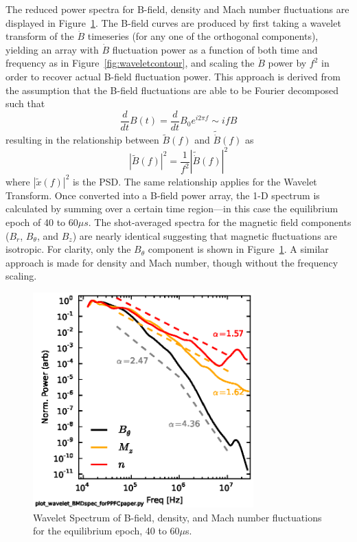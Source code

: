 \documentclass[12pt]{iopart}
\begin{document}
The reduced power spectra for B-field, density and Mach number fluctuations are displayed in Figure~\ref{fig:waveletspec}. The B-field curves are produced by first taking a wavelet transform of the $\dot{B}$ timeseries (for any one of the orthogonal components), yielding an array with $\dot{B}$ fluctuation power as a function of both time and frequency as in Figure~\ref{fig:waveletcontour}, and scaling the $\dot{B}$ power by $f^{2}$ in order to recover actual B-field fluctuation power. This approach is derived from the assumption that the B-field fluctuations are able to be Fourier decomposed such that
%
\begin{equation}
\frac{d}{dt}B(t) = \frac{d}{dt}B_{0}e^{i2\pi f} \sim ifB
\end{equation}
%
resulting in the relationship between $\tilde{B}(f)$ and $\tilde{\dot{B}}(f)$ as
%
\begin{equation}
|\tilde{B}(f)|^{2} = \frac{1}{f^{2}}|\tilde{\dot{B}}(f)|^{2}
\end{equation}
%
where $|\tilde{x}(f)|^{2}$ is the PSD. The same relationship applies for the Wavelet Transform. Once converted into a B-field power array, the 1-D spectrum is calculated by summing over a certain time region---in this case the equilibrium epoch of 40 to 60$\mu s$. The shot-averaged spectra for the magnetic field components ($B_{r}$, $B_{\theta}$, and $B_{z}$) are nearly identical suggesting that magnetic fluctuations are isotropic. For clarity, only the $B_{\theta}$ component is shown in Figure~\ref{fig:waveletspec}.  A similar approach is made for density and Mach number, though without the frequency scaling.

\begin{figure}[!htbp]
\centerline{
\includegraphics[width=8.5cm]{waveletspec.eps}}
\caption{\label{fig:waveletspec} Wavelet Spectrum of B-field, density, and Mach number fluctuations for the equilibrium epoch, 40 to 60$\mu$s.}
\end{figure}
\end{document}
